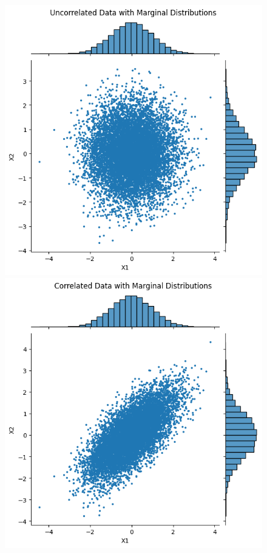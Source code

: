 \begin{figure}
    \label{fig:PITonData}
    \centering
    \begin{minipage}{0.4\textwidth}
        \centering
        \includegraphics[width=\textwidth]{3Theory/pictures/UncorrelatedScatter.png}
    \end{minipage}
    \hfill
    \begin{minipage}{0.4\textwidth}
        \centering
        \includegraphics[width=\textwidth]{3Theory/pictures/CorrelatedScatter.png}

\end{minipage}
\end{figure}
